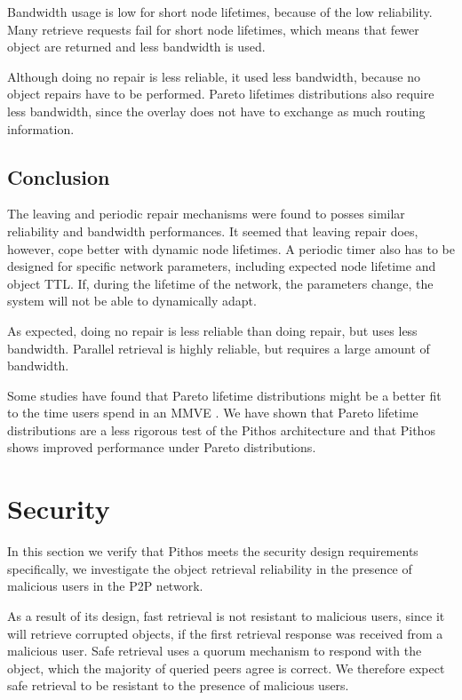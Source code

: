 Bandwidth usage is low for short node lifetimes, because of the low reliability. Many retrieve requests fail for short node lifetimes, which means that fewer object are returned and less bandwidth is used.

Although doing no repair is less reliable, it used less bandwidth, because no object repairs have to be performed. Pareto lifetimes distributions also require less bandwidth, since the overlay does not have to exchange as much routing information.

\subsection{Conclusion}

The leaving and periodic repair mechanisms were found to posses similar reliability and bandwidth performances. It seemed that leaving repair does, however, cope better with dynamic node lifetimes. A periodic timer also has to be designed for specific network parameters, including expected node lifetime and object TTL. If, during the lifetime of the network, the parameters change, the system will not be able to dynamically adapt.

As expected, doing no repair is less reliable than doing repair, but uses less bandwidth. Parallel retrieval is highly reliable, but requires a large amount of bandwidth.

Some studies have found that Pareto lifetime distributions might be a better fit to the time users spend in an MMVE \cite{}. We have shown that Pareto lifetime distributions are a less rigorous test of the Pithos architecture and that Pithos shows improved performance under Pareto distributions.

\section{Security}
\label{malicious_results}

In this section we verify that Pithos meets the security design requirements specifically, we investigate the object retrieval reliability in the presence of malicious users in the P2P network.

As a result of its design, fast retrieval is not resistant to malicious users, since it will retrieve corrupted objects, if the first retrieval response was received from a malicious user. Safe retrieval uses a quorum mechanism to respond with the object, which the majority of queried peers agree is correct. We therefore expect safe retrieval to be resistant to the presence of malicious users.

